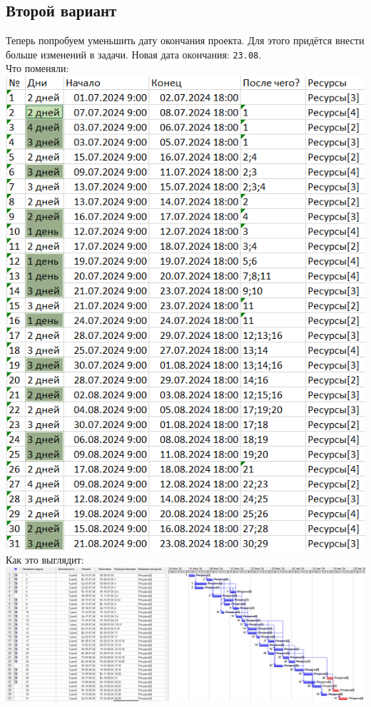 \documentclass[14pt]{article}
\begin{document}
	\subsection{Второй вариант}
		Теперь попробуем уменьшить дату окончания проекта.
		Для этого придётся внести больше изменений в задачи.
		Новая дата окончания: \texttt{23.08}.\\
		{\LARGE Что поменяли:}\\
		\includegraphics[height=0.6\textheight]{../img/2a2_days_change.png}\\ 
		{\LARGE Как это выглядит:}\\
		\includegraphics[width=\textwidth]{../img/ot2a2_1.png}\\
\end{document}
